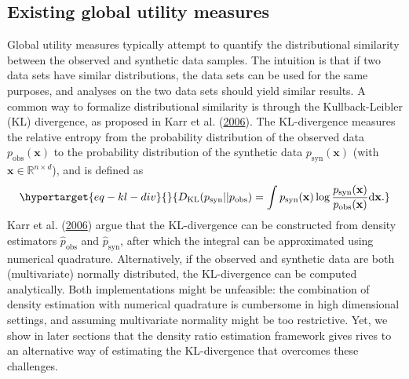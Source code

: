 \documentclass[
]{article}
\newcommand{\pobs}{p_{\text{obs}}}
\newcommand{\psyn}{p_{\text{syn}}}
\newcommand{\bx}{\mathbf{x}}
\begin{document}
\hypertarget{existing-global-utility-measures}{%
\subsection{Existing global utility
measures}\label{existing-global-utility-measures}}

Global utility measures typically attempt to quantify the distributional
similarity between the observed and synthetic data samples. The
intuition is that if two data sets have similar distributions, the data
sets can be used for the same purposes, and analyses on the two data
sets should yield similar results. A common way to formalize
distributional similarity is through the Kullback-Leibler (KL)
divergence, as proposed in Karr et al.
(\protect\hyperlink{ref-karr_utility_2006}{2006}). The KL-divergence
measures the relative entropy from the probability distribution of the
observed data \(\pobs(\bx)\) to the probability distribution of the
synthetic data \(\psyn(\bx)\) (with
\(\bx \in \mathbb{R}^{n \times d}\)), and is defined as
\begin{equation}\protect\hypertarget{eq-kl-div}{}{
D_{\text{KL}}(\psyn || \pobs) = 
\int \psyn(\bx) \log \frac{\psyn(\bx)}{\pobs(\bx)} \text{d} \bx.
}\label{eq-kl-div}\end{equation} Karr et al.
(\protect\hyperlink{ref-karr_utility_2006}{2006}) argue that the
KL-divergence can be constructed from density estimators
\(\hat{p}_\text{obs}\) and \(\hat{p}_\text{syn}\), after which the
integral can be approximated using numerical quadrature. Alternatively,
if the observed and synthetic data are both (multivariate) normally
distributed, the KL-divergence can be computed analytically. Both
implementations might be unfeasible: the combination of density
estimation with numerical quadrature is cumbersome in high dimensional
settings, and assuming multivariate normality might be too restrictive.
Yet, we show in later sections that the density ratio estimation
framework gives rives to an alternative way of estimating the
KL-divergence that overcomes these challenges.
\end{document}
